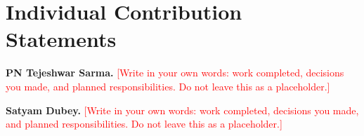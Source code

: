 \documentclass[11pt]{article}
\newcommand{\fillin}[1]{\textcolor{red}{[#1]}}
\begin{document}
\section*{Individual Contribution Statements}

\textbf{PN Tejeshwar Sarma.} \fillin{Write in your own words: work completed, decisions you made, and planned responsibilities. Do not leave this as a placeholder.}

\textbf{Satyam Dubey.} \fillin{Write in your own words: work completed, decisions you made, and planned responsibilities. Do not leave this as a placeholder.}
\end{document}
